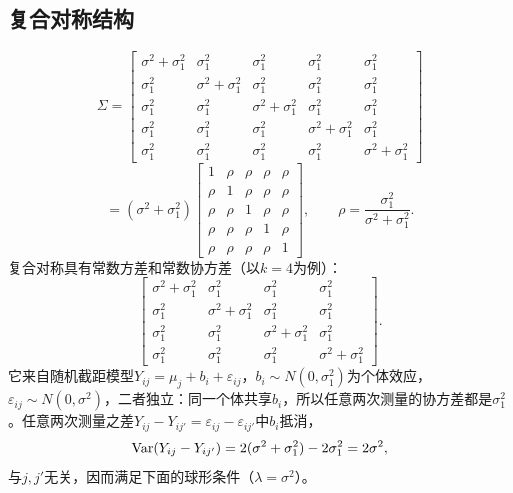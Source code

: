 \subsection{复合对称结构}
\[
\Sigma=\begin{bmatrix}
\sigma^2+\sigma_1^2&\sigma_1^2&\sigma_1^2&\sigma_1^2&\sigma_1^2\\
\sigma_1^2&\sigma^2+\sigma_1^2&\sigma_1^2&\sigma_1^2&\sigma_1^2\\
\sigma_1^2&\sigma_1^2&\sigma^2+\sigma_1^2&\sigma_1^2&\sigma_1^2\\
\sigma_1^2&\sigma_1^2&\sigma_1^2&\sigma^2+\sigma_1^2&\sigma_1^2\\
\sigma_1^2&\sigma_1^2&\sigma_1^2&\sigma_1^2&\sigma^2+\sigma_1^2
\end{bmatrix}
\]
\[
=(\sigma^2+\sigma_1^2)\begin{bmatrix}
1&\rho&\rho&\rho&\rho\\\rho&1&\rho&\rho&\rho\\\rho&\rho&1&\rho&\rho\\
\rho&\rho&\rho&1&\rho\\\rho&\rho&\rho&\rho&1
\end{bmatrix},\qquad
\rho=\frac{\sigma_1^2}{\sigma^2+\sigma_1^2}.
\]
复合对称具有常数方差和常数协方差（以$k=4$为例）：
\[
\begin{bmatrix}
\sigma^2+\sigma_1^2&\sigma_1^2&\sigma_1^2&\sigma_1^2\\
\sigma_1^2&\sigma^2+\sigma_1^2&\sigma_1^2&\sigma_1^2\\
\sigma_1^2&\sigma_1^2&\sigma^2+\sigma_1^2&\sigma_1^2\\
\sigma_1^2&\sigma_1^2&\sigma_1^2&\sigma^2+\sigma_1^2
\end{bmatrix}.
\]
它来自随机截距模型$Y_{ij}=\mu_j+b_i+\varepsilon_{ij}$，$b_i\sim N(0,\sigma_1^2)$为个体效应，$\varepsilon_{ij}\sim N(0,\sigma^2)$，二者独立：同一个体共享$b_i$，所以任意两次测量的协方差都是$\sigma_1^2$。任意两次测量之差$Y_{ij}-Y_{ij'}=\varepsilon_{ij}-\varepsilon_{ij'}$中$b_i$抵消，
\[
\operatorname{Var}(Y_{ij}-Y_{ij'})=2(\sigma^2+\sigma_1^2)-2\sigma_1^2=2\sigma^2,
\]
与$j,j'$无关，因而满足下面的球形条件（$\lambda=\sigma^2$）。
